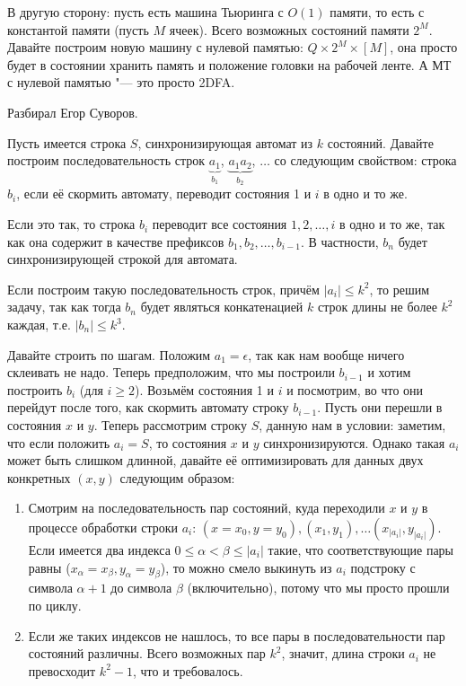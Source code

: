     В другую сторону: пусть есть машина Тьюринга с $O(1)$ памяти, то есть с константой памяти (пусть $M$ ячеек).
    Всего возможных состояний памяти $2^M$.
    Давайте построим новую машину с нулевой памятью: $Q\times 2^M \times [M]$, она просто будет в состоянии
    хранить память и положение головки на рабочей ленте.
    А МТ с нулевой памятью "--- это просто 2DFA.

	Разбирал Егор Суворов.

	Пусть имеется строка $S$, синхронизирующая автомат из $k$ состояний.
	Давайте построим последовательность строк $\underbrace{a_1}_{b_1}$, $\underbrace{a_1a_2}_{b_2}$, $\dots$
	со следующим свойством: строка $b_i$, если её скормить автомату, переводит состояния 1 и $i$ в одно и то же.
	\begin{Rem}
		Если это так, то строка $b_i$ переводит все состояния $1, 2, \dots, i$ в одно и то же,
		так как она содержит в качестве префиксов $b_1, b_2, \dots, b_{i-1}$.
		В частности, $b_n$ будет синхронизирующей строкой для автомата.
	\end{Rem}
	\begin{Rem}
		Если построим такую последовательность строк, причём $|a_i| \le k^2$, то решим
		задачу, так как тогда $b_n$ будет являться конкатенацией $k$ строк длины не более $k^2$ каждая,
		т.е. $|b_n| \le k^3$.
	\end{Rem}

	Давайте строить по шагам.
	Положим $a_1=\epsilon$, так как нам вообще ничего склеивать не надо.
	Теперь предположим, что мы построили $b_{i-1}$ и хотим построить $b_i$ (для $i \ge 2$).
	Возьмём состояния 1 и $i$ и посмотрим, во что они перейдут после того, как скормить автомату
	строку $b_{i-1}$.
	Пусть они перешли в состояния $x$ и $y$.
	Теперь рассмотрим строку $S$, данную нам в условии: заметим, что если положить $a_i=S$, то
	состояния $x$ и $y$ синхронизируются.
	Однако такая $a_i$ может быть слишком длинной, давайте её оптимизировать для данных двух конкретных $(x, y)$ следующим образом:
	\begin{enumerate}
		\item
			Смотрим на последовательность пар состояний, куда переходили $x$ и $y$
			в процессе обработки строки $a_i$: $(x=x_0, y=y_0), (x_1, y_1), \dots (x_{|a_i|}, y_{|a_i|})$.
			Если имеется два индекса $0 \le \alpha < \beta \le |a_i|$ такие, что
			соответствующие пары равны ($x_\alpha=x_\beta, y_\alpha=y_\beta$), то можно
			смело выкинуть из $a_i$ подстроку с символа $\alpha+1$ до символа $\beta$ (включительно),
			потому что мы просто прошли по циклу.
		\item
			Если же таких индексов не нашлось, то все пары в последовательности пар состояний различны.
			Всего возможных пар $k^2$, значит, длина строки $a_i$ не превосходит $k^2-1$, что и требовалось.
	\end{enumerate}


